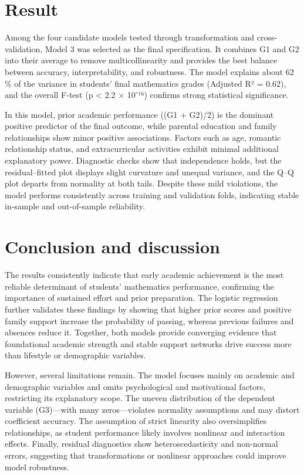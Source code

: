 \documentclass[9pt,twocolumn,twoside,]{pinp}
\begin{document}
\section{Result}\label{result}

Among the four candidate models tested through transformation and
cross-validation, Model 3 was selected as the final specification. It
combines G1 and G2 into their average to remove multicollinearity and
provides the best balance between accuracy, interpretability, and
robustness. The model explains about 62 \% of the variance in students'
final mathematics grades (Adjusted R² = 0.62), and the overall F-test (p
\textless{} 2.2 × 10⁻¹⁶) confirms strong statistical significance.

In this model, prior academic performance ((G1 + G2)/2) is the dominant
positive predictor of the final outcome, while parental education and
family relationships show minor positive associations. Factors such as
age, romantic relationship status, and extracurricular activities
exhibit minimal additional explanatory power. Diagnostic checks show
that independence holds, but the residual--fitted plot displays slight
curvature and unequal variance, and the Q--Q plot departs from normality
at both tails. Despite these mild violations, the model performs
consistently across training and validation folds, indicating stable
in-sample and out-of-sample reliability.

\section{Conclusion and discussion}\label{conclusion-and-discussion}

The results consistently indicate that early academic achievement is the
most reliable determinant of students' mathematics performance,
confirming the importance of sustained effort and prior preparation. The
logistic regression further validates these findings by showing that
higher prior scores and positive family support increase the probability
of passing, whereas previous failures and absences reduce it. Together,
both models provide converging evidence that foundational academic
strength and stable support networks drive success more than lifestyle
or demographic variables.

However, several limitations remain. The model focuses mainly on
academic and demographic variables and omits psychological and
motivational factors, restricting its explanatory scope. The uneven
distribution of the dependent variable (G3)---with many zeros---violates
normality assumptions and may distort coefficient accuracy. The
assumption of strict linearity also oversimplifies relationships, as
student performance likely involves nonlinear and interaction effects.
Finally, residual diagnostics show heteroscedasticity and non-normal
errors, suggesting that transformations or nonlinear approaches could
improve model robustness.
\end{document}

